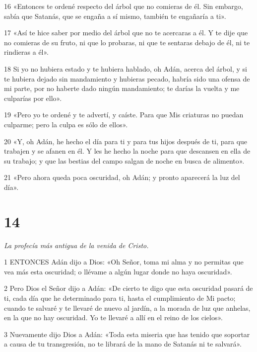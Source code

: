 \par 16 «Entonces te ordené respecto del árbol que no comieras de él. Sin embargo, sabía que Satanás, que se engaña a sí mismo, también te engañaría a ti».

\par 17 «Así te hice saber por medio del árbol que no te acercaras a él. Y te dije que no comieras de su fruto, ni que lo probaras, ni que te sentaras debajo de él, ni te rindieras a él».

\par 18 Si yo no hubiera estado y te hubiera hablado, oh Adán, acerca del árbol, y si te hubiera dejado sin mandamiento y hubieras pecado, habría sido una ofensa de mi parte, por no haberte dado ningún mandamiento; te darías la vuelta y me culparías por ello».

\par 19 «Pero yo te ordené y te advertí, y caíste. Para que Mis criaturas no puedan culparme; pero la culpa es sólo de ellos».

\par 20 «Y, oh Adán, he hecho el día para ti y para tus hijos después de ti, para que trabajen y se afanen en él. Y les he hecho la noche para que descansen en ella de su trabajo; y que las bestias del campo salgan de noche en busca de alimento».

\par 21 «Pero ahora queda poca oscuridad, oh Adán; y pronto aparecerá la luz del día».

\chapter{14}

\par \textit{La profecía más antigua de la venida de Cristo.}

\par 1 ENTONCES Adán dijo a Dios: «Oh Señor, toma mi alma y no permitas que vea más esta oscuridad; o llévame a algún lugar donde no haya oscuridad».

\par 2 Pero Dios el Señor dijo a Adán: «De cierto te digo que esta oscuridad pasará de ti, cada día que he determinado para ti, hasta el cumplimiento de Mi pacto; cuando te salvaré y te llevaré de nuevo al jardín, a la morada de luz que anhelas, en la que no hay oscuridad. Yo te llevaré a allí en el reino de los cielos».

\par 3 Nuevamente dijo Dios a Adán: «Toda esta miseria que has tenido que soportar a causa de tu transgresión, no te librará de la mano de Satanás ni te salvará».

